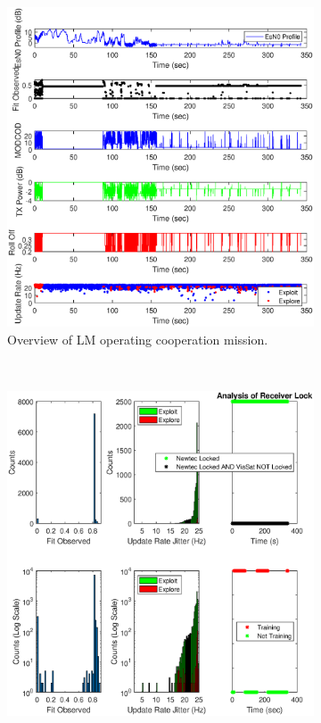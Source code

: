 \begin{figure}[ht!]
\centering
\begin{subfigure}{\linewidth}
	\centering
	\includegraphics[scale=0.5]{figures/c_sim_results/sim22_LM_overview_coop.eps}
	\caption{Overview of LM operating cooperation mission.}
	\label{fig:cSimLMOverview}
\end{subfigure}\\
\begin{subfigure}{\linewidth}
	\centering
	\includegraphics[scale=0.5]{figures/c_sim_results/sim22_LM_hists_coop.eps}

\end{subfigure}
\end{figure}
